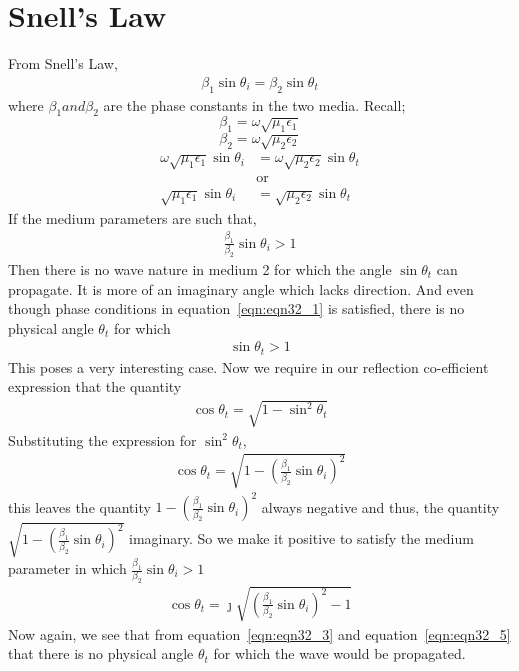 \section{Snell's Law}
From Snell's Law,
\begin{align}
\beta_1 \sin\theta_i = \beta_2 \sin\theta_t
\label{eqn:eqn32_1}
\end{align}
where $\beta_1 and \beta_2$ are the phase constants in the two media. Recall;
$$ \beta_{1} = \omega\sqrt{\mu_{1}\epsilon_{1}}$$
$$ \beta_{2} = \omega\sqrt{\mu_{2}\epsilon_{2}}$$
\begin{align*}
\omega\sqrt{\mu_1\epsilon_{1}} \sin\theta_i &= \omega\sqrt{\mu_2\epsilon_2}  \sin\theta_t\\
&\text{or}\\
\sqrt{\mu_1\epsilon_{1}} \sin\theta_i &= \sqrt{\mu_2\epsilon_2}  \sin\theta_t
\end{align*}
If the medium parameters are such that,
\begin{align}
\frac{\beta_1}{\beta_2}\sin\theta_i > 1
\end{align}
Then there is no wave nature in medium 2 for which the angle $\sin\theta_t$ can propagate. It is more of an imaginary angle which lacks direction. And even though phase conditions in equation~\ref{eqn:eqn32_1} is satisfied, there is no physical angle $\theta_t$ for which
\begin{align}
\sin\theta_t > 1
\label{eqn:eqn32_3}
\end{align}
This poses a very interesting case. Now we require in our reflection co-efficient expression that the quantity
\begin{align}
\cos\theta_t = \sqrt{1-\sin^2\theta_t}
\end{align}
Substituting the expression for $\sin^{2}\theta_{t}$,
\begin{align*}
\cos\theta_t = \sqrt{1-(\frac{\beta_1}{\beta_2}\sin\theta_i)^2}
\end{align*}
this leaves the quantity $1 - (\frac{\beta_1}{\beta_2}\sin\theta_i)^2$ always negative and thus, the quantity $\sqrt{1 - (\frac{\beta_1}{\beta_2}\sin\theta_i)^2}$ imaginary. So we make it positive to satisfy the medium parameter in which $\frac{\beta_1}{\beta_2}\sin\theta_i > 1$
\begin{align}
\cos\theta_t = \jmath\sqrt{(\frac{\beta_1}{\beta_2}\sin\theta_i)^2-1}
\label{eqn:eqn32_5}
\end{align}
Now again, we see that from equation~\ref{eqn:eqn32_3} and equation~\ref{eqn:eqn32_5} 
that there is no physical angle $\theta_t$ for which the wave would be propagated.

